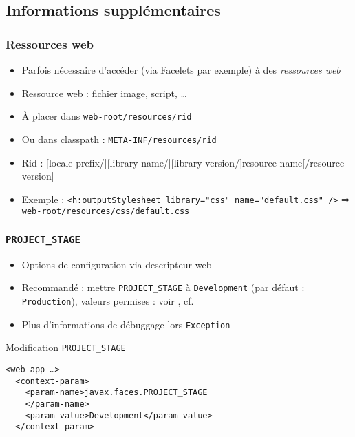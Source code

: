 \documentclass[english, french]{beamer}
\begin{document}
\subsection[Suppl]{Informations supplémentaires}
\begin{frame}
	\frametitle{Ressources web}
	\begin{itemize}
		\item Parfois nécessaire d’accéder (via Facelets par exemple) à des \emph{ressources web}
		\item Ressource web : fichier image, script, …
		\item À placer dans \texttt{web-root/resources/rid}
		\item Ou dans classpath : \texttt{META-INF/resources/rid}
		\item Rid : [locale-prefix/][library-name/][library-version/]resource-name[/resource-version]
		\item Exemple : \texttt{<h:outputStylesheet library="css" name="default.css" />} ⇒ \texttt{web-root/resources/css/default.css}
	\end{itemize}
\end{frame}

\begin{frame}[fragile]
	\frametitle{\texttt{PROJECT\_STAGE}}
	\begin{itemize}
		\item Options de configuration via descripteur web
		\item Recommandé : mettre \texttt{PROJECT\_STAGE} à \texttt{Development} {\tiny (par défaut : \texttt{Production}), valeurs permises : voir , cf. }%
		\item Plus d’informations de débuggage lors \texttt{Exception}
	\end{itemize}
	\begin{exampleblock}{Modification \texttt{PROJECT\_STAGE}}
		\begin{lstlisting}
<web-app …>
  <context-param>
    <param-name>javax.faces.PROJECT_STAGE
    </param-name>
    <param-value>Development</param-value>
  </context-param>
		\end{lstlisting}
	\end{exampleblock}
\end{frame}
\end{document}
